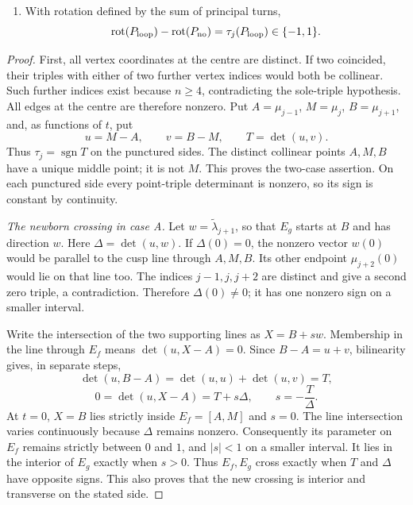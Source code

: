 \begin{lemma}
\begin{enumerate}
visit. In that case the complete edge between $c_1,c_2$ carries no crossing
on either side of the wall.
\item[(iv)] With rotation defined by the sum of principal turns,
\begin{equation}\label{cusppr:rotation-law}
\operatorname{rot}(P_{\rm loop})-\operatorname{rot}(P_{\rm no})
=\tau_j(P_{\rm loop})\in\{-1,1\}.
\end{equation}
\end{enumerate}
\end{lemma}

\begin{proof}
First, all vertex coordinates at the centre are distinct. If two coincided,
their triples with either of two further vertex indices would both be
collinear. Such further indices exist because $n\geq4$, contradicting the
sole-triple hypothesis. All edges at the centre are therefore nonzero.
Put $A=\mu_{j-1}$, $M=\mu_j$, $B=\mu_{j+1}$, and, as functions of $t$, put
\begin{equation}\label{cusppr:local-data}
u=M-A,\qquad v=B-M,\qquad T=\det(u,v).
\end{equation}
Thus $\tau_j=\operatorname{sgn}T$ on the punctured sides. The distinct
collinear points $A,M,B$ have a unique middle point; it is not $M$.
This proves the two-case assertion. On each punctured side every point-triple
determinant is nonzero, so its sign is constant by continuity.

\emph{The newborn crossing in case A.}
Let $w=\widetilde\lambda_{j+1}$, so that $E_g$ starts at $B$ and has
direction $w$. Here $\Delta=\det(u,w)$. If $\Delta(0)=0$, the nonzero
vector $w(0)$ would be parallel to the cusp line through $A,M,B$.
Its other endpoint $\mu_{j+2}(0)$ would lie on that line too. The indices
$j-1,j,j+2$ are distinct and give a second zero triple, a contradiction.
Therefore $\Delta(0)\ne0$; it has one nonzero sign on a smaller interval.

Write the intersection of the two supporting lines as $X=B+s w$.
Membership in the line through $E_f$ means $\det(u,X-A)=0$.
Since $B-A=u+v$, bilinearity gives, in separate steps,
\begin{equation}\label{cusppr:A-det}
\det(u,B-A)=\det(u,u)+\det(u,v)=T,
\end{equation}
\begin{equation}\label{cusppr:A-intersection}
0=\det(u,X-A)=T+s\Delta,
\qquad s=-\frac{T}{\Delta}.
\end{equation}
At $t=0$, $X=B$ lies strictly inside $E_f=[A,M]$ and $s=0$.
The line intersection varies continuously because $\Delta$ remains nonzero.
Consequently its parameter on $E_f$ remains strictly between $0$ and $1$,
and $|s|<1$ on a smaller interval. It lies in the interior of $E_g$ exactly
when $s>0$. Thus $E_f,E_g$ cross exactly when $T$ and $\Delta$ have
opposite signs. This also proves that the new crossing is interior and
transverse on the stated side.


\end{proof}
